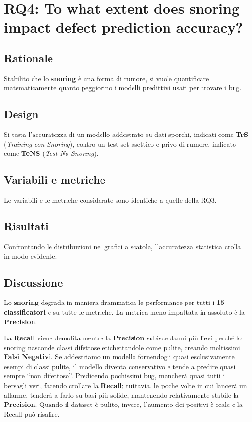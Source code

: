 \section{RQ4: To what extent does snoring impact defect prediction accuracy?}

\subsection{Rationale}

Stabilito che lo \textbf{snoring} è una forma di rumore, si vuole quantificare matematicamente quanto peggiorino i modelli predittivi usati per trovare i bug.

\subsection{Design}

Si testa l'accuratezza di un modello addestrato su dati sporchi, indicati come \textbf{TrS} (\textit{Training con Snoring}), contro un test set asettico e privo di rumore, indicato come \textbf{TeNS} (\textit{Test No Snoring}).

\subsection{Variabili e metriche}

Le variabili e le metriche considerate sono identiche a quelle della RQ3.

\subsection{Risultati}

Confrontando le distribuzioni nei grafici a scatola, l'accuratezza statistica crolla in modo evidente.

\subsection{Discussione}

Lo \textbf{snoring} degrada in maniera drammatica le performance per tutti i \textbf{15 classificatori} e su tutte le metriche. La metrica meno impattata in assoluto è la \textbf{Precision}.

\begin{notaesame}
La \textbf{Recall} viene demolita mentre la \textbf{Precision} subisce danni più lievi perché lo snoring nasconde classi difettose etichettandole come pulite, creando moltissimi \textbf{Falsi Negativi}. Se addestriamo un modello fornendogli quasi esclusivamente esempi di classi pulite, il modello diventa conservativo e tende a predire quasi sempre ``non difettoso''. Predicendo pochissimi bug, mancherà quasi tutti i bersagli veri, facendo crollare la \textbf{Recall}; tuttavia, le poche volte in cui lancerà un allarme, tenderà a farlo su basi più solide, mantenendo relativamente stabile la \textbf{Precision}. Quando il dataset è pulito, invece, l'aumento dei positivi è reale e la Recall può risalire.
\end{notaesame}

